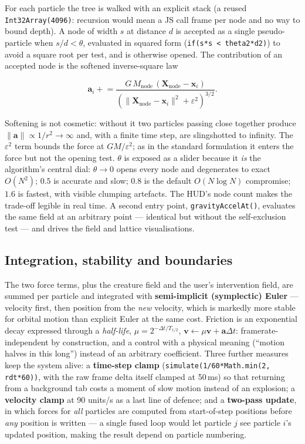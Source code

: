 \documentclass[10pt,a4paper]{article}
\newcommand{\code}[1]{\texttt{\small #1}}
\begin{document}
For each particle the tree is walked with an explicit stack (a reused \code{Int32Array(4096)}: recursion
would mean a JS call frame per node and no way to bound depth). A node of width $s$ at distance $d$ is
accepted as a single pseudo-particle when $s/d<\theta$, evaluated in squared form
(\code{if(s*s < theta2*d2)}) to avoid a square root per test, and is otherwise opened. The contribution of
an accepted node is the softened inverse-square law

\begin{equation}
\mathbf{a}_i \mathrel{+}= \frac{G\,M_{\text{node}}\,(\mathbf{X}_{\text{node}} - \mathbf{x}_i)}{\left(\|\mathbf{X}_{\text{node}} - \mathbf{x}_i\|^2 + \varepsilon^2\right)^{3/2}}.
\end{equation}

\noindent Softening is not cosmetic: without it two particles passing close together produce
$\|\mathbf{a}\|\propto 1/r^2\to\infty$ and, with a finite time step, are slingshotted to infinity. The
$\varepsilon^2$ term bounds the force at $GM/\varepsilon^2$; as in the standard formulation it enters the
force but not the opening test. $\theta$ is exposed as a slider because it \emph{is} the algorithm's
central dial: $\theta\to0$ opens every node and degenerates to exact $O(N^2)$; $0.5$ is accurate and slow;
$0.8$ is the default $O(N\log N)$ compromise; $1.6$ is fastest, with visible clumping artefacts. The HUD's
node count makes the trade-off legible in real time. A second entry point, \code{gravityAccelAt()},
evaluates the same field at an arbitrary point --- identical but without the self-exclusion test --- and
drives the field and lattice visualisations.

\subsection{Integration, stability and boundaries}

The two force terms, plus the creature field and the user's intervention field, are summed per particle and
integrated with \textbf{semi-implicit (symplectic) Euler} --- velocity first, then position from the
\emph{new} velocity, which is markedly more stable for orbital motion than explicit Euler at the same cost.
Friction is an exponential decay expressed through a \emph{half-life},
$\mu = 2^{-\Delta t/T_{1/2}}$, $\mathbf{v}\leftarrow\mu\mathbf{v}+\mathbf{a}\Delta t$: framerate-independent
by construction, and a control with a physical meaning (``motion halves in this long'') instead of an
arbitrary coefficient. Three further measures keep the system alive: a \textbf{time-step clamp}
(\code{simulate(1/60*Math.min(2, rdt*60))}, with the raw frame delta itself clamped at 50\,ms) so that
returning from a background tab costs a moment of slow motion instead of an explosion; a \textbf{velocity
clamp} at 90 units/s as a last line of defence; and a \textbf{two-pass update}, in which forces for
\emph{all} particles are computed from start-of-step positions before \emph{any} position is written --- a
single fused loop would let particle $j$ see particle $i$'s updated position, making the result depend on
particle numbering.
\end{document}
